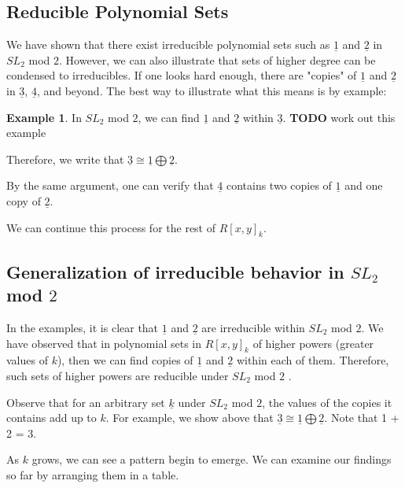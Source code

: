 \documentclass[a4paper,draft]{amsproc}
\theoremstyle{plain}
\theoremstyle{definition}
\newtheorem{exm}{Example}[section]
\theoremstyle{remark}
\numberwithin{equation}{section}
\begin{document}
\subsection{Reducible Polynomial Sets}
We have shown that there exist irreducible polynomial sets such as $\underline{1}$ and $\underline{2}$ in  $SL_{2}$ mod $2$. However, we can also illustrate that sets of higher degree can be condensed to irreducibles. If one looks hard enough, there are "copies" of $\underline{1}$ and $\underline{2}$ in $\underline{3}$, $\underline{4}$, and beyond. The best way to illustrate what this means is by example: 
\begin{exm}

In  $SL_{2}$ mod $2$, we can find $\underline{1}$ and $\underline{2}$ within $\underline{3}$. 
\textbf{TODO} work out this example

Therefore, we write that $\underline{3} \cong \underline{1} \bigoplus \underline{2}$. 
\end{exm}

By the same argument, one can verify that $\underline{4}$ contains two copies of $\underline{1}$ and one copy of $\underline{2}$. 

We can continue this process for the rest of $R[x,y]_{k}$. 

\subsection{Generalization of irreducible behavior in $SL_{2}$ mod $2$}
In the examples, it is clear that $\underline{1}$ and $\underline{2}$ are irreducible within $SL_{2}$ mod $2$. We have observed that in polynomial sets in $R[x,y]_{k}$  of higher powers (greater values of $k$), then we can find copies of $\underline{1}$ and $\underline{2}$ within each of them. Therefore, such sets of higher powers are reducible under $SL_{2}$ mod $2$ . 

Observe that for an arbitrary set $\underline{k}$ under $SL_{2}$ mod $2$, the values of the copies it contains add up to $k$. For example, we show above that $\underline{3} \cong \underline{1} \bigoplus \underline{2}$. Note that 1 + 2 = 3. 

As $k$ grows, we can see a pattern begin to emerge. We can examine our findings so far by arranging them in a table. 
\end{document}
